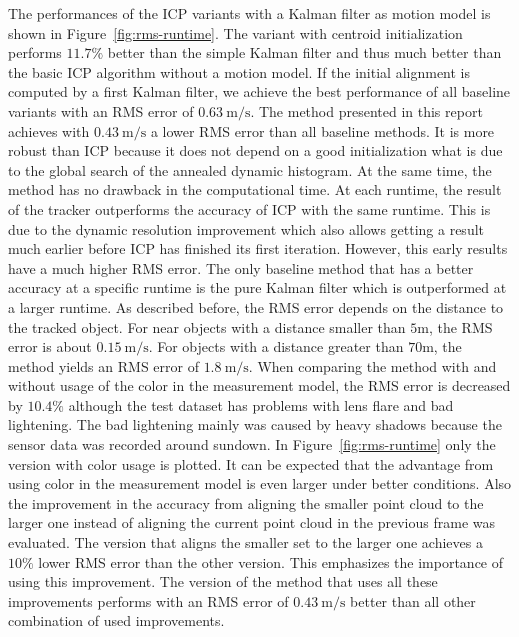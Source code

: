 \documentclass[twoside,a4paper,article]{combine}
\begin{document}
The performances of the ICP variants with a Kalman filter as motion
model is shown in Figure~\ref{fig:rms-runtime}. The variant with
centroid initialization performs $11.7\%$ better than the simple
Kalman filter and thus much better than the basic ICP algorithm
without a motion model. If the initial alignment is computed by a
first Kalman filter, we achieve the best performance of all baseline
variants with an RMS error of $0.63\mathrm{~m/s}$. The method
presented in this report achieves with $0.43\mathrm{~m/s}$ a lower RMS
error than all baseline methods. It is more robust than ICP because it
does not depend on a good initialization what is due to the global
search of the annealed dynamic histogram. At the same time, the method
has no drawback in the computational time. At each runtime, the result
of the tracker outperforms the accuracy of ICP with the same
runtime. This is due to the dynamic resolution improvement which also
allows getting a result much earlier before ICP has finished its first
iteration. However, this early results have a much higher RMS
error. The only baseline method that has a better accuracy at a
specific runtime is the pure Kalman filter which is outperformed at a
larger runtime. As described before, the RMS error depends on the
distance to the tracked object. For near objects with a distance
smaller than $5$m, the RMS error is about $0.15\mathrm{~m/s}$. For
objects with a distance greater than $70$m, the method yields an RMS
error of $1.8\mathrm{~m/s}$. When comparing the method with and
without usage of the color in the measurement model, the RMS error is
decreased by $10.4\%$ although the test dataset has problems with lens
flare and bad lightening. The bad lightening mainly was caused by heavy
shadows because the sensor data was recorded around sundown.
In Figure~\ref{fig:rms-runtime} only the version with color
usage is plotted. It can be expected that the advantage from
using color in the measurement model is even larger under better
conditions.  Also the improvement in the accuracy from aligning the
smaller point cloud to the larger one instead of aligning the current
point cloud in the previous frame was evaluated. The version that
aligns the smaller set to the larger one achieves a $10\%$ lower RMS
error than the other version. This emphasizes the importance of using
this improvement.
The version of the method that uses all these improvements performs
with an RMS error of $0.43\mathrm{~m/s}$ better than all other
combination of used improvements.
\end{document}
